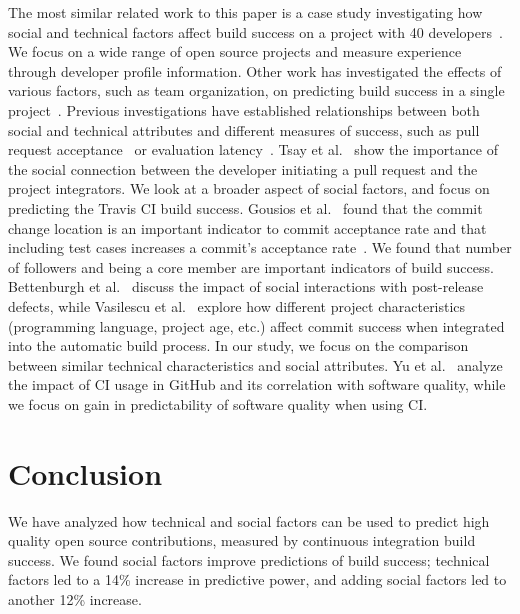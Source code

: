 \documentclass[10pt, conference]{IEEEtran}
\begin{document}
The most similar related work to this paper is a case study investigating how
social and technical factors affect build
success on a project with 40 developers~\cite{Hassan06}.
We focus on a wide range of open source projects and
measure experience through developer profile information.
Other work has investigated the effects of various factors, such as team
organization, on predicting build success in a single
project~\cite{Kwan11,Wolf09}.
Previous investigations have established relationships between both social and 
technical 
attributes and 
different measures of success, such as pull request acceptance~\cite{gousios14, 
gousios15,tsay14icse,tsay14fse} or evaluation latency~\cite{Yu15}.
Tsay et al.~\cite{tsay14icse} 
show the importance of the social connection between the developer initiating a
pull request and the project integrators. We look at a broader aspect of 
social factors, and focus on predicting the Travis CI build success.
Gousios et al.~\cite{gousios14} found that the commit change location is
an important indicator to commit acceptance rate and that including
test cases increases a
commit's acceptance rate~\cite{gousios15}. We found that number of followers and being a core member are important indicators of build success. 
Bettenburgh et 
al.~\cite{bettenburgh10} discuss the impact of social interactions with 
post-release defects, while Vasilescu et al.~\cite{vasilescu14} explore how different 
project characteristics (programming language, project age, etc.) affect commit 
success when integrated into the automatic build process. In our study, we focus on the comparison between similar technical characteristics and social attributes. Yu et al.~\cite{yu16} 
analyze the impact of CI usage in GitHub and its correlation with software 
quality, while we focus on gain in predictability of software quality when using CI.

\balance
\section{Conclusion}

We have analyzed how technical and social factors can be used to
predict high quality open source contributions, measured by continuous
integration build success.  We found social factors improve predictions of build 
success; technical factors led to a 14\% increase in predictive power, and 
adding social factors led to another 12\% increase. 
\end{document}
